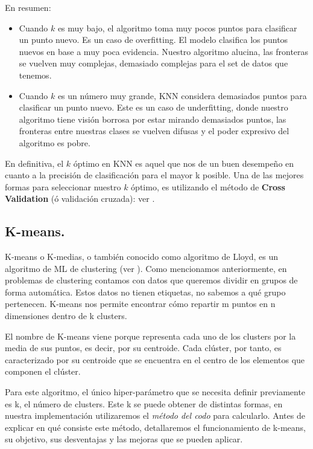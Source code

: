 \documentclass[12pt,a4paper]{article}
\begin{document}
\begin{sloppypar}
En resumen:
\begin{itemize}
\item Cuando $k$ es muy bajo, el algoritmo toma muy pocos puntos para clasificar un punto nuevo. Es un caso de overfitting. El modelo clasifica los puntos nuevos en base a muy poca evidencia. Nuestro algoritmo alucina, las fronteras se vuelven muy complejas, demasiado complejas para el set de datos que tenemos. 
\item Cuando $k$ es un número muy grande, KNN considera demasiados puntos para clasificar un punto nuevo. Este es un caso de underfitting, donde nuestro algoritmo tiene visión borrosa por estar mirando demasiados puntos, las fronteras entre nuestras clases se vuelven difusas y el poder expresivo del algoritmo es pobre. 
\end{itemize}

En definitiva, el $k$ óptimo en KNN es aquel que nos de un buen desempeño en cuanto a la precisión de clasificación para el mayor k posible. Una de las mejores formas para seleccionar nuestro $k$ óptimo, es utilizando el método de \textbf{Cross Validation} (ó validación cruzada): ver \textit{}.

\cleardoublepage
\subsection{K-means.}
K-means o K-medias, o también conocido como algoritmo de Lloyd, es un algoritmo de ML de clustering (ver \textit{}). Como mencionamos anteriormente, en problemas de clustering contamos con datos que queremos dividir en grupos de forma automática. Estos datos no tienen etiquetas, no sabemos a qué grupo pertenecen. K-means nos permite encontrar cómo repartir m puntos en n dimensiones dentro de k clusters.

El nombre de K-means viene porque representa cada uno de los clusters por la media de sus puntos, es decir, por su centroide. Cada clúster, por tanto, es caracterizado por su centroide que se encuentra en el centro de los elementos que componen el clúster.

Para este algoritmo, el único hiper-parámetro que se necesita definir previamente es k, el número de clusters. Este k se puede obtener de distintas formas, en nuestra implementación utilizaremos el \textit{método del codo} para calcularlo. Antes de explicar en qué consiste este método, detallaremos el funcionamiento de k-means, su objetivo, sus desventajas y las mejoras que se pueden aplicar.


\end{sloppypar}
\end{document}
